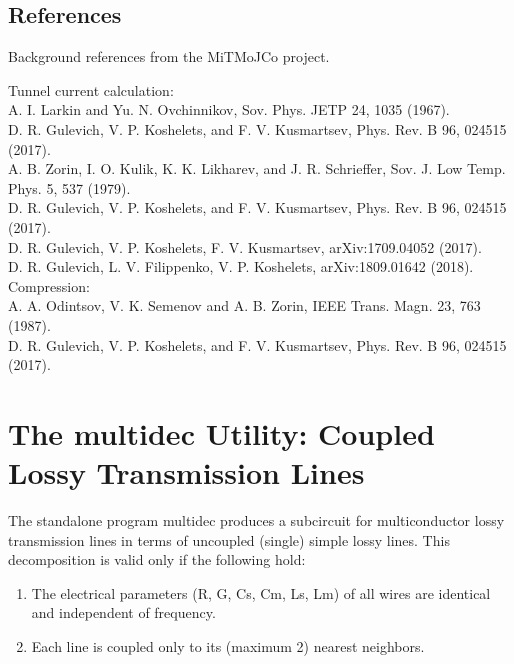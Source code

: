 {\subsection{References}

Background references from the MiTMoJCo project.

Tunnel current calculation:\\
A. I. Larkin and Yu. N. Ovchinnikov, Sov. Phys. JETP 24, 1035 (1967).\\
D. R. Gulevich, V. P. Koshelets, and F. V. Kusmartsev, Phys. Rev. B 96,
 024515 (2017).\\
A. B. Zorin, I. O. Kulik, K. K. Likharev, and J. R. Schrieffer, Sov. J. 
 Low Temp. Phys. 5, 537 (1979).\\
D. R. Gulevich, V. P. Koshelets, and F. V. Kusmartsev, Phys.  Rev. B 96,
 024515 (2017).\\
D. R. Gulevich, V. P. Koshelets, F. V. Kusmartsev, arXiv:1709.04052 (2017).\\
D. R. Gulevich, L. V. Filippenko, V. P. Koshelets, arXiv:1809.01642 (2018).\\

Compression:\\
A. A. Odintsov, V. K. Semenov and A. B. Zorin, IEEE Trans. Magn. 23, 763
 (1987).\\
D. R. Gulevich, V. P. Koshelets, and F. V. Kusmartsev, Phys. Rev. B 96,
  024515 (2017).

\section{The {\vt multidec} Utility: Coupled Lossy Transmission Lines}


The standalone program {\vt multidec} produces a subcircuit for
multiconductor lossy transmission lines in terms of uncoupled (single)
simple lossy lines.  This decomposition is valid only if the following
hold:

\begin{enumerate}
\item{The electrical parameters (R, G, Cs, Cm, Ls, Lm) of all wires are
 identical and independent of frequency.}
\item{Each line is coupled only to its (maximum 2) nearest neighbors.}
\end{enumerate}

}
